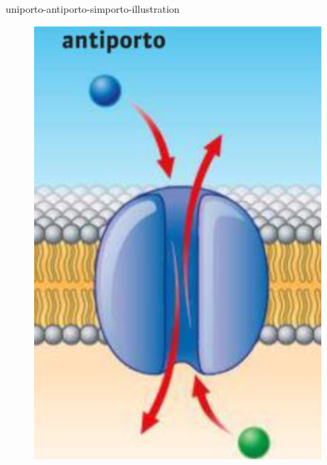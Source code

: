\documentclass[preview]{standalone}
\begin{document}
\begin{snippet}{uniporto-antiporto-simporto-illustration}
\begin{figure}[h!]
\begin{minipage}{0.3\textwidth}
          \includegraphics[width=\linewidth]{resources/antiporto.png}
        \end{minipage}%
        \hfill
        \begin{minipage}{0.3\textwidth}
          \centering

\end{minipage}
\end{figure}
\end{snippet}
\end{document}
